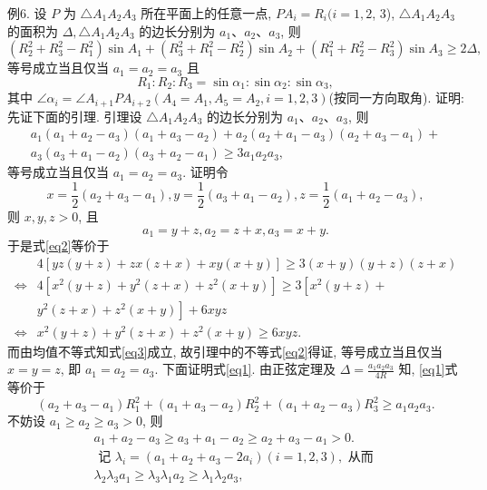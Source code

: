 例6. 设 $P$ 为 $\triangle A_1 A_2 A_3$ 所在平面上的任意一点, $P A_i=R_i(i=1,2$, 3), $\triangle A_1 A_2 A_3$ 的面积为 $\Delta, \triangle A_1 A_2 A_3$ 的边长分别为 $a_1 、 a_2 、 a_3$, 则
$$
\left(R_2^2+R_3^2-R_1^2\right) \sin A_1+\left(R_3^2+R_1^2-R_2^2\right) \sin A_2+\left(R_1^2+R_2^2-R_3^2\right) \sin A_3 \geqslant 2 \Delta, \label{eq1}
$$
等号成立当且仅当 $a_1=a_2=a_3$ 且
$$
R_1: R_2: R_3=\sin \alpha_1: \sin \alpha_2: \sin \alpha_3,
$$
其中 $\angle \alpha_i=\angle A_{i+1} P A_{i+2}\left(A_4=A_1, A_5=A_2, i=1,2,3\right)$(按同一方向取角).
证明:先证下面的引理.
引理设 $\triangle A_1 A_2 A_3$ 的边长分别为 $a_1 、 a_2 、 a_3$, 则
$$
\begin{gathered}
a_1\left(a_1+a_2-a_3\right)\left(a_1+a_3-a_2\right)+a_2\left(a_2+a_1-a_3\right)\left(a_2+a_3-a_1\right)+ \\
a_3\left(a_3+a_1-a_2\right)\left(a_3+a_2-a_1\right) \geqslant 3 a_1 a_2 a_3, \label{eq2}
\end{gathered}
$$
等号成立当且仅当 $a_1=a_2=a_3$.
证明令
$$
x=\frac{1}{2}\left(a_2+a_3-a_1\right), y=\frac{1}{2}\left(a_3+a_1-a_2\right), z=\frac{1}{2}\left(a_1+a_2-a_3\right),
$$
则 $x, y, z>0$, 且
$$
a_1=y+z, a_2=z+x, a_3=x+y .
$$
于是式\ref{eq2}等价于
$$
\begin{aligned}
& 4[y z(y+z)+z x(z+x)+x y(x+y)] \geqslant 3(x+y)(y+z)(z+x) \\
\Leftrightarrow & 4\left[x^2(y+z)+y^2(z+x)+z^2(x+y)\right] \geqslant 3\left[x^2(y+z)+\right. \\
& \left.y^2(z+x)+z^2(x+y)\right]+6 x y z \\
\Leftrightarrow & x^2(y+z)+y^2(z+x)+z^2(x+y) \geqslant 6 x y z .
\end{aligned} \label{eq3}
$$
而由均值不等式知式\ref{eq3}成立, 故引理中的不等式\ref{eq2}得证, 等号成立当且仅当 $x=y=z$, 即 $a_1=a_2=a_3$.
下面证明式\ref{eq1}.
由正弦定理及 $\Delta=\frac{a_1 a_2 a_3}{4 R}$ 知, \ref{eq1}式等价于
$$
\left(a_2+a_3-a_1\right) R_1^2+\left(a_1+a_3-a_2\right) R_2^2+\left(a_1+a_2-a_3\right) R_3^2 \geqslant a_1 a_2 a_3 . \label{eq4}
$$
不妨设 $a_1 \geqslant a_2 \geqslant a_3>0$, 则
$$
\begin{gathered}
a_1+a_2-a_3 \geqslant a_3+a_1-a_2 \geqslant a_2+a_3-a_1>0 . \\
\text { 记 } \lambda_i=\left(a_1+a_2+a_3-2 a_i\right)(i=1,2,3), \text { 从而 } \\
\lambda_2 \lambda_3 a_1 \geqslant \lambda_3 \lambda_1 a_2 \geqslant \lambda_1 \lambda_2 a_3,
\end{gathered}
$$

